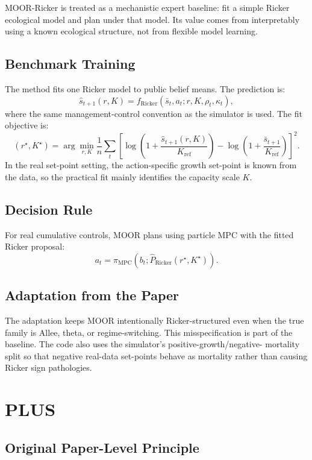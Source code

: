 \documentclass[11pt]{article}
\newcommand{\1}{\mathbf{1}}
\begin{document}
MOOR-Ricker is treated as a mechanistic expert baseline: fit a simple Ricker
ecological model and plan under that model.  Its value comes from interpretably
using a known ecological structure, not from flexible model learning.

\subsection{Benchmark Training}

The method fits one Ricker model to public belief means.  The prediction is:
\[
  \hat{s}_{t+1}(r,K)
  =
  f_{\mathrm{Ricker}}(\bar{s}_t,a_t;r,K,\rho_t,\kappa_t),
\]
where the same management-control convention as the simulator is used.  The fit
objective is:
\[
  (r^\star,K^\star)
  =
  \arg\min_{r,K}
  \frac{1}{n}\sum_t
  \left[
    \log\left(1+\frac{\hat{s}_{t+1}(r,K)}{K_{\mathrm{ref}}}\right)
    -
    \log\left(1+\frac{\bar{s}_{t+1}}{K_{\mathrm{ref}}}\right)
  \right]^2.
\]
In the real set-point setting, the action-specific growth set-point is known
from the data, so the practical fit mainly identifies the capacity scale $K$.

\subsection{Decision Rule}

For real cumulative controls, MOOR plans using particle MPC with the fitted
Ricker proposal:
\[
  a_t=\pi_{\mathrm{MPC}}(b_t;\hat{P}_{\mathrm{Ricker}}(r^\star,K^\star)).
\]

\subsection{Adaptation from the Paper}

The adaptation keeps MOOR intentionally Ricker-structured even when the true
family is Allee, theta, or regime-switching.  This misspecification is part of
the baseline.  The code also uses the simulator's positive-growth/negative-
mortality split so that negative real-data set-points behave as mortality rather
than causing Ricker sign pathologies.

\section{PLUS}

\subsection{Original Paper-Level Principle}
\end{document}

